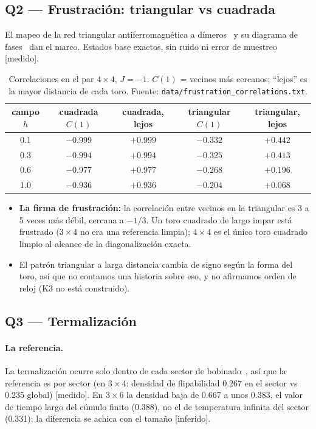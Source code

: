 \documentclass[11pt,a4paper]{article}
\newcommand{\code}[1]{\nolinkurl{#1}}
\begin{document}
\subsection{Q2 --- Frustraci\'on: triangular vs cuadrada}
El mapeo de la red triangular antiferromagn\'etica a d\'imeros~\cite{moessner2001} y su diagrama de fases~\cite{isakov2003} dan el marco. Estados base exactos, sin ruido ni error de muestreo [medido].

\begin{table}[h]\centering\small
\caption{Correlaciones en el par $4\times4$, $J=-1$. $C(1)$ = vecinos m\'as cercanos; ``lejos'' es la
mayor distancia de cada toro. Fuente: \code{data/frustration\_correlations.txt}.}
\begin{tabular}{ccc|cc}
\toprule
campo $h$ & cuadrada $C(1)$ & cuadrada, lejos & triangular $C(1)$ & triangular, lejos\\
\midrule
0.1 & $-0.999$ & $+0.999$ & $-0.332$ & $+0.442$\\
0.3 & $-0.994$ & $+0.994$ & $-0.325$ & $+0.413$\\
0.6 & $-0.977$ & $+0.977$ & $-0.268$ & $+0.196$\\
1.0 & $-0.936$ & $+0.936$ & $-0.204$ & $+0.068$\\
\bottomrule
\end{tabular}
\end{table}
\begin{itemize}[leftmargin=1.4em]
  \item \textbf{La firma de frustraci\'on:} la correlaci\'on entre vecinos en la triangular es 3 a 5 veces
    m\'as d\'ebil, cercana a $-1/3$. Un toro cuadrado de largo impar est\'a frustrado ($3\times4$ no era
    una referencia limpia); $4\times4$ es el \'unico toro cuadrado limpio al alcance de la diagonalizaci\'on exacta.
  \item El patr\'on triangular a larga distancia cambia de signo seg\'un la forma del toro, as\'i que no
    contamos una historia sobre eso, y no afirmamos orden de reloj (K3 no est\'a construido).
\end{itemize}

\subsection{Q3 --- Termalizaci\'on}
\paragraph{La referencia.} La termalizaci\'on ocurre solo dentro de cada sector de bobinado~\cite{lan2017}, as\'i que la
referencia es por sector (en $3\times4$: densidad de flipabilidad 0.267 en el sector vs 0.235 global) [medido].
En $3\times6$ la densidad baja de 0.667 a unos 0.383, el valor de tiempo largo del c\'umulo finito (0.388), no el
de temperatura infinita del sector (0.331); la diferencia se achica con el tama\~no [inferido].
\end{document}
